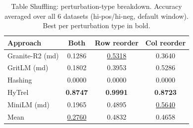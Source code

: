 \begin{table}[t]
\centering
\begin{tabular*}{\textwidth}{lccc}
\hline
Approach & Both & Row reorder & Col reorder \\
\hline
Granite-R2 (md) & 0.1286 & \underline{0.5318} & 0.3640 \\
GritLM (md) & 0.1802 & 0.3953 & 0.5286 \\
Hashing & 0.0000 & 0.0000 & 0.0000 \\
HyTrel & \textbf{0.8747} & \textbf{0.9991} & \textbf{0.8723} \\
MiniLM (md) & 0.1965 & 0.4895 & \underline{0.5640} \\
\hline
Mean & \underline{0.2760} & 0.4832 & 0.4658 \\
\hline
\end{tabular*}
\caption{Table Shuffling: perturbation-type breakdown. Accuracy averaged over all 6 datasets (hi-pos/hi-neg, default window). Best per perturbation type in bold.}
\label{tab:shuffling_perturbation}
\end{table}
